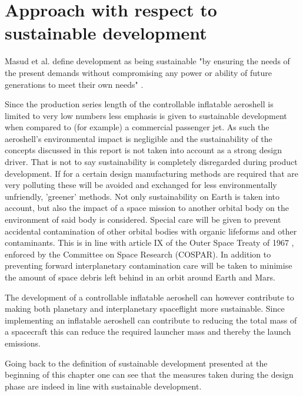 \section{Approach with respect to sustainable development}
\label{ch:sustain}
Masud et al. define development as being sustainable "by ensuring the needs of the present demands without compromising any power or ability of future generations to meet their own needs" \cite{Masud2011}.

Since the production series length of the controllable inflatable aeroshell is limited to very low numbers less emphasis is given to sustainable development when compared to (for example) a commercial passenger jet. As such the aeroshell's environmental impact is negligible and the sustainability of the concepts discussed in this report is not taken into account as a strong design driver. That is not to say sustainability is completely disregarded during product development. If for a certain design manufacturing methods are required that are very polluting these will be avoided and exchanged for less environmentally unfriendly, 'greener' methods. 
Not only sustainability on Earth is taken into account, but also the impact of a space mission to another orbital body on the environment of said body is considered. Special care will be given to prevent accidental contamination of other orbital bodies with organic lifeforms and other contaminants. This is in line with article IX of the Outer Space Treaty of 1967 \cite{UnitedNations2008}, enforced by the Committee on Space Research (COSPAR). In addition to preventing forward interplanetary contamination care will be taken to minimise the amount of space debris left behind in an orbit around Earth and Mars. 

The development of a controllable inflatable aeroshell can however contribute to making both planetary and interplanetary spaceflight more sustainable. Since implementing an inflatable aeroshell can contribute to reducing the total mass of a spacecraft this can reduce the required launcher mass and thereby the launch emissions.

Going back to the definition of sustainable development presented at the beginning of this chapter one can see that the measures taken during the design phase are indeed in line with sustainable development.